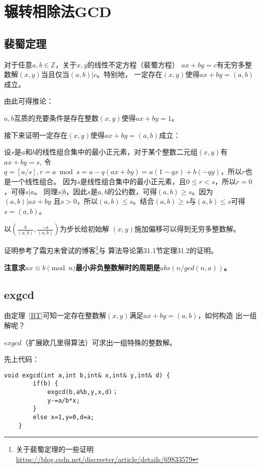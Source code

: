 \section{辗转相除法GCD}
\subsection{裴蜀定理}
\begin{theorem}\label{BT}
	对于任意$a,b\in \mathbb{Z}$，关于$x,y$的线性不定方程（裴蜀方程）
	$ax+by=c$有无穷多整数解$(x,y)$当且仅当$(a,b)|c$。特别地，
	一定存在$(x,y)$使得$ax+by=(a,b)$成立。
\end{theorem}

由此可得推论：

\begin{inference}
	$a,b$互质的充要条件是存在整数$(x,y)$使得$ax+by=1$。
\end{inference}

接下来证明一定存在$(x,y)$使得$ax+by=(a,b)$成立：

设$s$是$a$和$b$的线性组合集中的最小正元素，对于某个整数二元组$(x,y)$有$ax+by=s$,
令$q=[a/s],r=a \bmod s=a-q(ax+by)=a(1-qx)+b(-qy)$，所以$r$也是一个线性组合。
因为$s$是线性组合集中的最小正元素，且$0\leq r < s$，所以$r=0$，可得$s|a$。
同理$s|b$，因此$s$是$a,b$的公约数，可得$(a,b) \geq s$。因为$(a,b)|ax+by$
且$s>0$，所以$(a,b) \leq s$。结合$(a,b) \geq s$与$(a,b) \leq s$可得
$s=(a,b)$。

以$(\frac{b}{(a,b)},\frac{-a}{(a,b)})$为步长给初始解
$(x,y)$施加偏移可以得到无穷多整数解。

证明参考了霜刃未曾试的博客\footnote{关于裴蜀定理的一些证明\\
	\url{https://blog.csdn.net/discreeter/article/details/69833579}}与
算法导论\cite{ITA3}第31.1节定理31.2的证明。

{\bfseries 注意求$ax\equiv b\pmod{n}$最小非负整数解时的周期是$abs(n/gcd(n,a))$。}

\subsection{exgcd}
由定理~\ref{BT}可知一定存在整数解$(x,y)$满足$ax+by=(a,b)$，如何构造
出一组解呢？

$exgcd$（扩展欧几里得算法）可求出一组特殊的整数解。

先上代码：

\begin{lstlisting}[title=exgcd]
    void exgcd(int a,int b,int& x,int& y,int& d) {
        if(b) {
            exgcd(b,a%b,y,x,d)；
            y-=a/b*x;
        }
        else x=1,y=0,d=a;
    }
\end{lstlisting}

